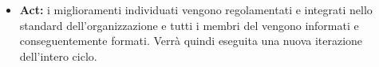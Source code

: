 \begin{itemize}
\iffalse


\fi 


	\item  \textbf{Act:} i miglioramenti individuati vengono regolamentati e integrati nello standard dell'organizzazione e tutti i membri del  vengono informati e conseguentemente formati. Verrà quindi eseguita una nuova iterazione dell'intero ciclo. \\
	
\end{itemize}
